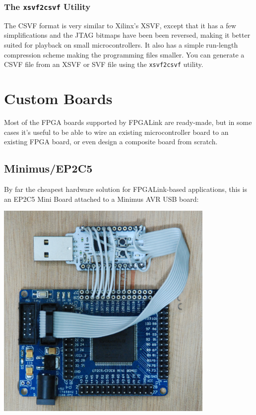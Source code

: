 \subsubsection{The \texttt{xsvf2csvf} Utility}
The CSVF format is very similar to Xilinx's XSVF, except that it has a few simplifications and the JTAG bitmaps have been been reversed, making it better suited for playback on small microcontrollers. It also has a simple run-length compression scheme making the programming files smaller. You can generate a CSVF file from an XSVF or SVF file using the \texttt{xsvf2csvf} utility.

\appendix
\newpage
\section{Custom Boards}
\label{apdx:custom}

Most of the FPGA boards supported by FPGALink are ready-made, but in some cases it's useful to be able to wire an existing microcontroller board to an existing FPGA board, or even design a composite board from scratch.

\subsection{Minimus/EP2C5}
By far the cheapest hardware solution for FPGALink-based applications, this is an EP2C5 Mini Board attached to a Minimus AVR USB board:

\vspace*{0.5cm}
\centerline{\includegraphics[width=300pt]{images/ep2c5}}

